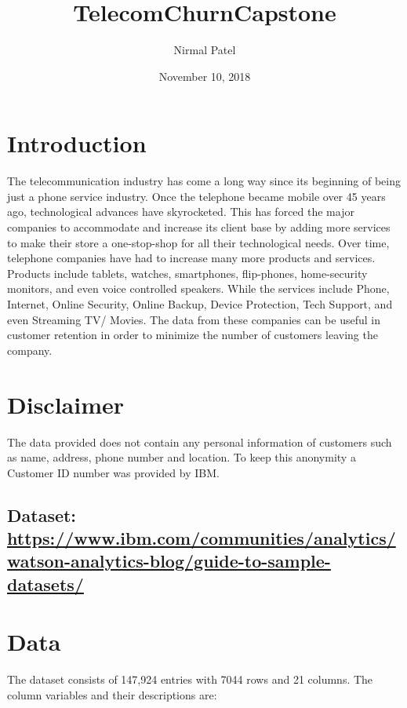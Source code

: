 \documentclass[]{article}
\title{TelecomChurnCapstone}
\author{Nirmal Patel}
\date{November 10, 2018}
\begin{document}
\maketitle

\section{Introduction}\label{introduction}

The telecommunication industry has come a long way since its beginning
of being just a phone service industry. Once the telephone became mobile
over 45 years ago, technological advances have skyrocketed. This has
forced the major companies to accommodate and increase its client base
by adding more services to make their store a one-stop-shop for all
their technological needs. Over time, telephone companies have had to
increase many more products and services. Products include tablets,
watches, smartphones, flip-phones, home-security monitors, and even
voice controlled speakers. While the services include Phone, Internet,
Online Security, Online Backup, Device Protection, Tech Support, and
even Streaming TV/ Movies. The data from these companies can be useful
in customer retention in order to minimize the number of customers
leaving the company.

\section{Disclaimer}\label{disclaimer}

The data provided does not contain any personal information of customers
such as name, address, phone number and location. To keep this anonymity
a Customer ID number was provided by IBM.

\subsection{\texorpdfstring{Dataset:
\url{https://www.ibm.com/communities/analytics/watson-analytics-blog/guide-to-sample-datasets/}}{Dataset: https://www.ibm.com/communities/analytics/watson-analytics-blog/guide-to-sample-datasets/}}\label{dataset-httpswww.ibm.comcommunitiesanalyticswatson-analytics-blogguide-to-sample-datasets}

\section{Data}\label{data}

The dataset consists of 147,924 entries with 7044 rows and 21 columns.
The column variables and their descriptions are:
\end{document}

